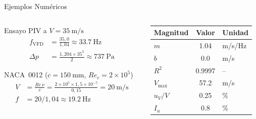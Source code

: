 \documentclass[aspectratio=169,12pt]{beamer}
\begin{document}
\begin{frame}{Ejemplos Numéricos}
	\begin{columns}
		\begin{column}{0.48\textwidth}
			\begin{block}{Ensayo PIV a $V = \SI{35}{\m\per\s}$}
				\begin{align*}
					f_\mathrm{VFD} & = \frac{35{,}0}{1{,}04}
					\approx \SI{33.7}{\Hz}                           \\
					\Delta p       & = \frac{1{,}204 \times 35^2}{2}
					\approx \SI{737}{\Pa}
				\end{align*}
			\end{block}
			\vspace{0.2em}
			\begin{block}{NACA~0012 ($c=\SI{150}{\mm}$, $Re_c=2\!\times\!10^5$)}
				\vspace{-0.5em}
				\begin{align*}
					V & = \frac{Re\,\nu}{c}
					= \frac{2\!\times\!10^5 \times 1{,}5\!\times\!10^{-5}}{0{,}15}
					= \SI{20}{\m\per\s}                    \\
					f & = 20/1{,}04 \approx \SI{19.2}{\Hz}
				\end{align*}
				\vspace{-0.5em}
			\end{block}
		\end{column}
		\begin{column}{0.48\textwidth}
			\centering\small
			\begin{tabular}{lSl}
				\toprule
				\textbf{Magnitud} & {\textbf{Valor}} & \textbf{Unidad} \\
				\midrule
				$m$               & 1.04             & m/s/Hz          \\
				$b$               & 0.0              & m/s             \\
				$R^2$             & 0.9997           & --              \\
				$V_\mathrm{max}$  & 57.2             & m/s             \\
				$u_V/V$           & 0.25             & \%              \\
				$I_u$             & 0.8              & \%              \\
				\bottomrule
			\end{tabular}
		\end{column}
	\end{columns}
\end{frame}
\end{document}
